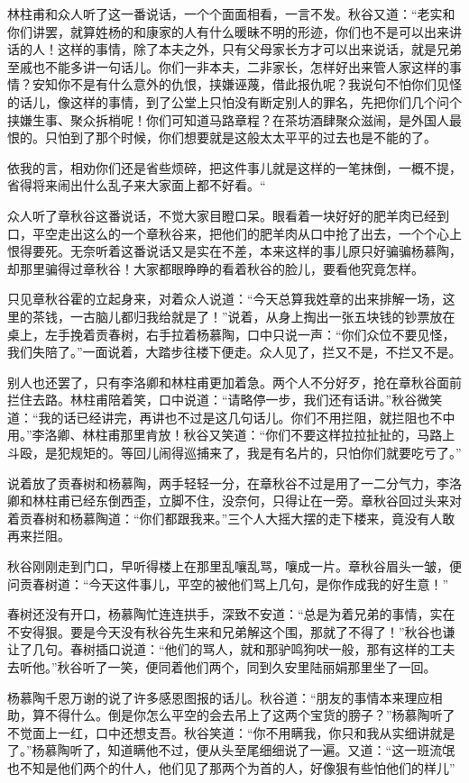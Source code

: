 \documentclass[12pt,UTF8]{ctexbook}
\begin{document}
{{{林柱甫和众人听了这一番说话，一个个面面相看，一言不发。秋谷又道：“老实和你们讲罢，就算姓杨的和康家的人有什么暖昧不明的形迹，你们也不是可以出来讲话的人！这样的事情，除了本夫之外，只有父母家长方才可以出来说话，就是兄弟至戚也不能多讲一句话儿。你们一非本夫，二非家长，怎样好出来管人家这样的事情？安知你不是有什么意外的仇恨，挟嫌诬蔑，借此报仇呢？我说句不怕你们见怪的话儿，像这样的事情，到了公堂上只怕没有断定别人的罪名，先把你们几个问个挟嫌生事、聚众拆梢呢！你们可知道马路章程？在茶坊酒肆聚众滋闹，是外国人最恨的。只怕到了那个时候，你们想要就是这般太太平平的过去也是不能的了。

依我的言，相劝你们还是省些烦碎，把这件事儿就是这样的一笔抹倒，一概不提，省得将来闹出什么乱子来大家面上都不好看。“

众人听了章秋谷这番说话，不觉大家目瞪口呆。眼看着一块好好的肥羊肉已经到口，平空走出这么的一个章秋谷来，把他们的肥羊肉从口中抢了出去，一个个心上恨得要死。无奈听着这番说话又是实在不差，本来这样的事儿原只好骗骗杨慕陶，却那里骗得过章秋谷！大家都眼睁睁的看着秋谷的脸儿，要看他究竟怎样。

只见章秋谷霍的立起身来，对着众人说道：“今天总算我姓章的出来排解一场，这里的茶钱，一古脑儿都归我给就是了！”说着，从身上掏出一张五块钱的钞票放在桌上，左手挽着贡春树，右手拉着杨慕陶，口中只说一声：“你们众位不要见怪，我们失陪了。”一面说着，大踏步往楼下便走。众人见了，拦又不是，不拦又不是。

别人也还罢了，只有李洛卿和林柱甫更加着急。两个人不分好歹，抢在章秋谷面前拦住去路。林柱甫陪着笑，口中说道：“请略停一步，我们还有话讲。”秋谷微笑道：“我的话已经讲完，再讲也不过是这几句话儿。你们不用拦阻，就拦阻也不中用。”李洛卿、林柱甫那里肯放！秋谷又笑道：“你们不要这样拉拉扯扯的，马路上斗殴，是犯规矩的。等回儿闹得巡捕来了，我是有名片的，只怕你们就要吃亏了。”

说着放了贡春树和杨慕陶，两手轻轻一分，在章秋谷不过是用了一二分气力，李洛卿和林柱甫已经东倒西歪，立脚不住，没奈何，只得让在一旁。章秋谷回过头来对着贡春树和杨慕陶道：“你们都跟我来。”三个人大摇大摆的走下楼来，竟没有人敢再来拦阻。

秋谷刚刚走到门口，早听得楼上在那里乱嚷乱骂，嚷成一片。章秋谷眉头一皱，便问贡春树道：“今天这件事儿，平空的被他们骂上几句，是你作成我的好生意！”

春树还没有开口，杨慕陶忙连连拱手，深致不安道：“总是为着兄弟的事情，实在不安得狠。要是今天没有秋谷先生来和兄弟解这个围，那就了不得了！”秋谷也谦让了几句。春树插口说道：“他们的骂人，就和那驴鸣狗吠一般，那有这样的工夫去听他。”秋谷听了一笑，便同着他们两个，同到久安里陆丽娟那里坐了一回。

杨慕陶千恩万谢的说了许多感恩图报的话儿。秋谷道：“朋友的事情本来理应相助，算不得什么。倒是你怎么平空的会去吊上了这两个宝货的膀子？”杨慕陶听了不觉面上一红，口中还想支吾。秋谷笑道：“你不用瞒我，你只和我从实细讲就是了。”杨慕陶听了，知道瞒他不过，便从头至尾细细说了一遍。又道：“这一班流氓也不知是他们两个的什人，他们见了那两个为首的人，好像狠有些怕他们的样儿”

}}}
\end{document}
